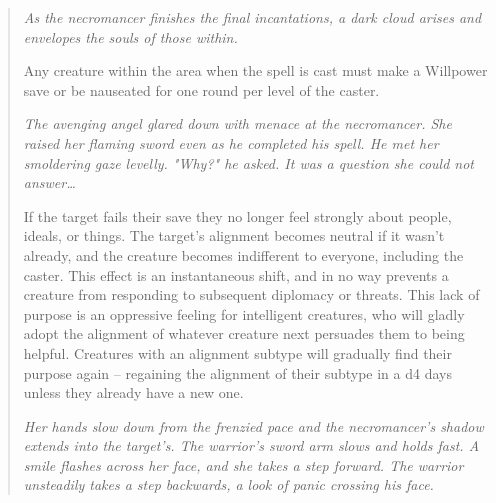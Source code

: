 \begin{quote}

\begin{small}
\end{small}
\emph{As the necromancer finishes the final incantations, a dark cloud arises and envelopes the souls of those within.}

Any creature within the area when the spell is cast must make a Willpower save or be nauseated for one round per level of the caster.\\

\begin{small}
\end{small}
\emph{The avenging angel glared down with menace at the necromancer. She raised her flaming sword even as he completed his spell. He met her smoldering gaze levelly. "Why?" he asked. It was a question she could not answer\ldots}

If the target fails their save they no longer feel strongly about people, ideals, or things. The target's alignment becomes neutral if it wasn't already, and the creature becomes indifferent to everyone, including the caster. This effect is an instantaneous shift, and in no way prevents a creature from responding to subsequent diplomacy or threats. This lack of purpose is an oppressive feeling for intelligent creatures, who will gladly adopt the alignment of whatever creature next persuades them to being helpful. Creatures with an alignment subtype will gradually find their purpose again -- regaining the alignment of their subtype in a d4 days unless they already have a new one.\\

\begin{small}
\end{small}
\emph{Her hands slow down from the frenzied pace and the necromancer's shadow extends into the target's. The warrior's sword arm slows and holds fast. A smile flashes across her face, and she takes a step forward. The warrior unsteadily takes a step backwards, a look of panic crossing his face.}


\end{quote}
